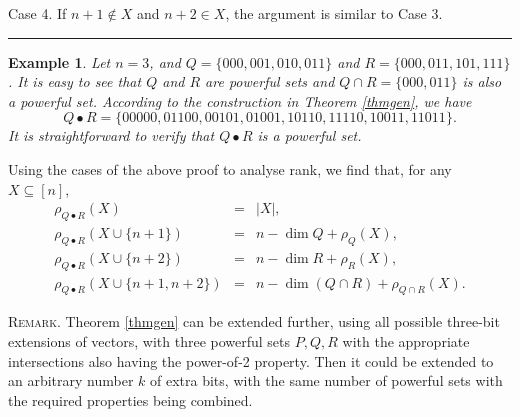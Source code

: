 \documentclass[12pt]{article}
\newtheorem{exa}[thm]{Example}
\def\qed{\hfill \rule{4pt}{7pt}}
\begin{document}
Case 4. If $n+1\not\in X$ and $n+2\in X$, the argument is similar to Case 3. \qed

\begin{exa}
Let $n=3$, and $Q=\{000, 001, 010, 011\}$ and $R=\{000,011,101,111\}$. It is easy to see that $Q$ and $R$ are powerful sets and $Q\cap R=\{000,011\}$ is also a powerful set. According to the construction in Theorem \ref{thmgen}, we have
\[Q\bullet R=\{00000, 01100, 00101, 01001, 10110, 11110, 10011, 11011\}.\]
It is straightforward to verify that $Q\bullet R$ is a powerful set.
\end{exa}

Using the cases of the above proof to analyse rank, we find that, for any $X\subseteq[n]$,
\begin{eqnarray*}
\rho_{Q\bullet R}(X)  & = &  |X|,   \\
\rho_{Q\bullet R}(X\cup\{n+1\})  & = &  n-\dim Q+\rho_Q(X),   \\
\rho_{Q\bullet R}(X\cup\{n+2\})  & = &  n-\dim R+\rho_R(X),   \\
\rho_{Q\bullet R}(X\cup\{n+1,n+2\})  & = &  n-\dim(Q\cap R)+\rho_{Q\cap R}(X).
\end{eqnarray*}


\textsc{Remark.} Theorem \ref{thmgen} can be extended further, using all possible three-bit extensions of vectors, with three powerful sets $P,Q,R$ with the appropriate intersections also having the power-of-2 property.  Then it could be extended to an arbitrary number $k$ of extra bits, with the same number of powerful sets with the required properties being combined.




%
%
%
%
%
\end{document}
